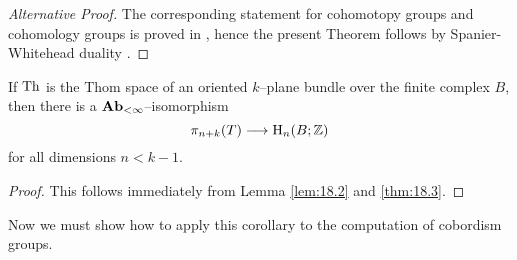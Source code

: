 \documentclass[../main]{subfiles}
\begin{document}
\begin{proof}[Alternative Proof]
The corresponding statement for cohomotopy groups and cohomology groups is proved in \cite{serre}, hence the present Theorem follows by Spanier-Whitehead duality \cite{spanier-whitehead}.
\end{proof}

\begin{corollary}
\label{cor:18.4}
If $\operatorname{Th}$ is the Thom space of an oriented $k$--plane bundle over the finite complex $B$, then there is a $\mathbf{Ab}_{<\infty}$--isomorphism \[\pi_{n + k}(T) \longrightarrow \operatorname{H}_n(B; \mathbb Z)\] for all dimensions $n < k - 1$. 
\end{corollary}

\begin{proof}
This follows immediately from Lemma \ref{lem:18.2} and \ref{thm:18.3}.
\end{proof}

Now we must show how to apply this corollary to the computation of cobordism groups.
\end{document}
